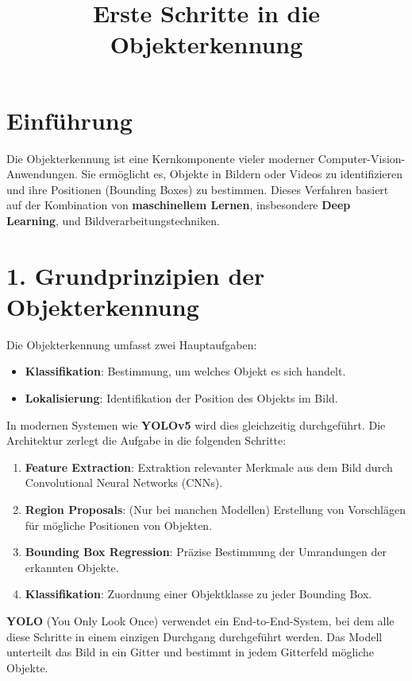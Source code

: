 \documentclass{article}
\title{Erste Schritte in die Objekterkennung}
\author{}
\date{}
\begin{document}
\maketitle

\section*{Einführung }
Die Objekterkennung ist eine Kernkomponente vieler moderner Computer-Vision-Anwendungen. Sie ermöglicht es, Objekte in Bildern oder Videos zu identifizieren und ihre Positionen (Bounding Boxes) zu bestimmen. Dieses Verfahren basiert auf der Kombination von \textbf{maschinellem Lernen}, insbesondere \textbf{Deep Learning}, und Bildverarbeitungstechniken.

\section*{1. Grundprinzipien der Objekterkennung}
Die Objekterkennung umfasst zwei Hauptaufgaben:
\begin{itemize}
    \item \textbf{Klassifikation}: Bestimmung, um welches Objekt es sich handelt.
    \item \textbf{Lokalisierung}: Identifikation der Position des Objekts im Bild.
\end{itemize}

In modernen Systemen wie \textbf{YOLOv5} wird dies gleichzeitig durchgeführt. Die Architektur zerlegt die Aufgabe in die folgenden Schritte:
\begin{enumerate}
    \item \textbf{Feature Extraction}: Extraktion relevanter Merkmale aus dem Bild durch Convolutional Neural Networks (CNNs).
    \item \textbf{Region Proposals}: (Nur bei manchen Modellen) Erstellung von Vorschlägen für mögliche Positionen von Objekten.
    \item \textbf{Bounding Box Regression}: Präzise Bestimmung der Umrandungen der erkannten Objekte.
    \item \textbf{Klassifikation}: Zuordnung einer Objektklasse zu jeder Bounding Box.
\end{enumerate}

\textbf{YOLO} (You Only Look Once) verwendet ein End-to-End-System, bei dem alle diese Schritte in einem einzigen Durchgang durchgeführt werden. Das Modell unterteilt das Bild in ein Gitter und bestimmt in jedem Gitterfeld mögliche Objekte.
\end{document}
